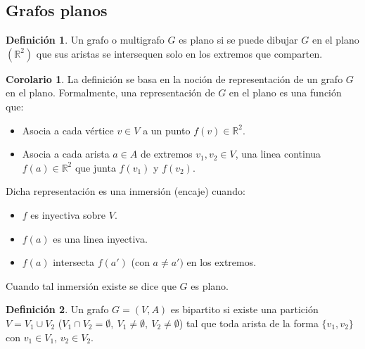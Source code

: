 \documentclass[10pt]{article}
\theoremstyle{definition}
\newtheorem{definition}{Definición}[section]
\newtheorem{corollary}{Corolario}[theorem]
\begin{document}
\subsection{Grafos planos}
\begin{definition}
	Un grafo o multigrafo $G$ es plano si se puede dibujar $G$ en el plano $(\mathbb{R}^2)$ que sus aristas se intersequen solo en los extremos que comparten.
\end{definition}
\begin{corollary}
	La definición se basa en la noción de representación de un grafo $G$ en el plano. Formalmente, una representación de $G$ en el plano es una función que:
	\begin{itemize}
		\item Asocia a cada vértice $v\in V$ a un punto $f(v)\in\mathbb{R}^2$.
		\item Asocia a cada arista $a\in A$ de extremos $v_1,v_2\in V$, una linea continua $f(a)\in\mathbb{R}^2$ que junta $f(v_1)$ y $f(v_2)$.
	\end{itemize}
	Dicha representación es una inmersión (encaje) cuando:
	\begin{itemize}
		\item $f$ es inyectiva sobre $V$.
		\item $f(a)$ es una linea inyectiva.
		\item $f(a)$ intersecta $f(a')$ (con $a\neq a')$ en los extremos.
	\end{itemize}
	Cuando tal inmersión existe se dice que $G$ es plano.
\end{corollary}
\begin{definition}
	Un grafo $G=(V,A)$ es bipartito si existe una partición $V=V_1\cup V_2$ ($V_1\cap V_2=\emptyset,\ V_1\neq\emptyset,\ V_2\neq\emptyset$) tal que toda arista de la forma $\{v_1,v_2\}$ con $v_1\in V_1$, $v_2\in V_2$.
\end{definition}
\end{document}
